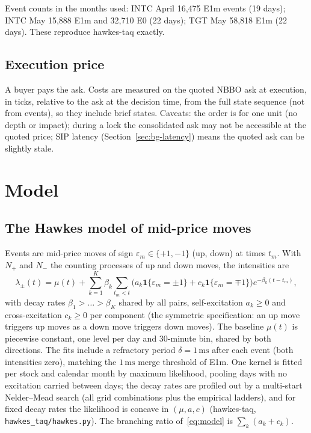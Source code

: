 \documentclass[11pt]{article}
\theoremstyle{definition}
\theoremstyle{remark}
\newcommand{\Eo}{\textsf{E0}}
\newcommand{\Em}{\textsf{E1m}}
\newcommand{\ms}{\,\text{ms}}
\newcommand{\file}[1]{\texttt{#1}}
\newcommand{\one}{\mathbf{1}}
\begin{document}
\noindent Event counts in the months used: INTC April 16,475 \Em{} events (19 days); INTC May 15,888 \Em{} and 32,710 \Eo{} (22 days); TGT May 58,818 \Em{} (22 days). These reproduce hawkes-taq exactly.

\subsection{Execution price}

A buyer pays the ask. Costs are measured on the quoted NBBO ask at execution, in ticks, relative to the ask at the decision time, from the full state sequence (not from events), so they include brief states. Caveats: the order is for one unit (no depth or impact); during a lock the consolidated ask may not be accessible at the quoted price; SIP latency (Section~\ref{sec:bg-latency}) means the quoted ask can be slightly stale.

\section{Model}
\label{sec:model}

\subsection{The Hawkes model of mid-price moves}

Events are mid-price moves of sign $\varepsilon_m \in \{+1, -1\}$ (up, down) at times $t_m$. With $N_+$ and $N_-$ the counting processes of up and down moves, the intensities are
\begin{equation}
\lambda_\pm(t) = \mu(t) + \sum_{k=1}^K \beta_k \sum_{t_m < t} \Big( a_k \one\{\varepsilon_m = \pm 1\} + c_k \one\{\varepsilon_m = \mp 1\} \Big) e^{-\beta_k (t - t_m)} ,
\label{eq:model}
\end{equation}
with decay rates $\beta_1 > \dots > \beta_K$ shared by all pairs, self-excitation $a_k \ge 0$ and cross-excitation $c_k \ge 0$ per component (the symmetric specification: an up move triggers up moves as a down move triggers down moves). The baseline $\mu(t)$ is piecewise constant, one level per day and 30-minute bin, shared by both directions. The fits include a refractory period $\delta = 1\ms$ after each event (both intensities zero), matching the $1\ms$ merge threshold of \Em. One kernel is fitted per stock and calendar month by maximum likelihood, pooling days with no excitation carried between days; the decay rates are profiled out by a multi-start Nelder--Mead search (all grid combinations plus the empirical ladders), and for fixed decay rates the likelihood is concave in $(\mu, a, c)$ (hawkes-taq, \file{hawkes\_taq/hawkes.py}). The branching ratio of~\eqref{eq:model} is $\sum_k (a_k + c_k)$.
\end{document}
